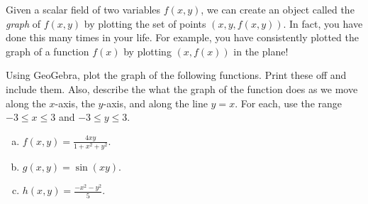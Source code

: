 \documentclass[12pt]{article} %
\begin{document}
\newpage
\begin{problem}
Given a scalar field of two variables $f(x,y)$, we can create an object called the \emph{graph} of $f(x,y)$ by plotting the set of points $(x,y,f(x,y))$. In fact, you have done this many times in your life. For example, you have consistently plotted the graph of a function $f(x)$ by plotting $(x,f(x))$ in the plane!  

Using GeoGebra, plot the graph of the following functions. Print these off and include them.  Also, describe the what the graph of the function does as we move along the $x$-axis, the $y$-axis, and along the line $y=x$. For each, use the range $-3\leq x \leq 3$ and $-3\leq y \leq 3$.
\begin{enumerate}[(a)]
	\item $f(x,y) = \frac{4xy}{1+x^2+y^2}$.
	\item $g(x,y) = \sin(xy)$.
	\item $h(x,y) = \frac{-x^2-y^2}{5}$.
\end{enumerate}
\end{problem}
\end{document}
